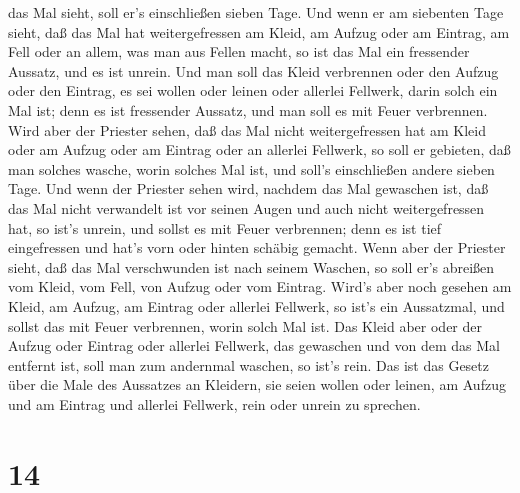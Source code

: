 das Mal sieht, soll er's einschließen sieben Tage.  Und
wenn er am siebenten Tage sieht, daß das Mal hat weitergefressen am
Kleid, am Aufzug oder am Eintrag, am Fell oder an allem, was man aus
Fellen macht, so ist das Mal ein fressender Aussatz, und es ist unrein.
 Und man soll das Kleid verbrennen oder den Aufzug oder den
Eintrag, es sei wollen oder leinen oder allerlei Fellwerk, darin solch
ein Mal ist; denn es ist fressender Aussatz, und man soll es mit Feuer
verbrennen.  Wird aber der Priester sehen, daß das Mal
nicht weitergefressen hat am Kleid oder am Aufzug oder am Eintrag oder
an allerlei Fellwerk,  so soll er gebieten, daß man solches
wasche, worin solches Mal ist, und soll's einschließen andere sieben
Tage.  Und wenn der Priester sehen wird, nachdem das Mal
gewaschen ist, daß das Mal nicht verwandelt ist vor seinen Augen und
auch nicht weitergefressen hat, so ist's unrein, und sollst es mit Feuer
verbrennen; denn es ist tief eingefressen und hat's vorn oder hinten
schäbig gemacht.  Wenn aber der Priester sieht, daß das Mal
verschwunden ist nach seinem Waschen, so soll er's abreißen vom Kleid,
vom Fell, von Aufzug oder vom Eintrag.  Wird's aber noch
gesehen am Kleid, am Aufzug, am Eintrag oder allerlei Fellwerk, so ist's
ein Aussatzmal, und sollst das mit Feuer verbrennen, worin solch Mal
ist.  Das Kleid aber oder der Aufzug oder Eintrag oder
allerlei Fellwerk, das gewaschen und von dem das Mal entfernt ist, soll
man zum andernmal waschen, so ist's rein.  Das ist das
Gesetz über die Male des Aussatzes an Kleidern, sie seien wollen oder
leinen, am Aufzug und am Eintrag und allerlei Fellwerk, rein oder unrein
zu sprechen.

\hypertarget{section-13}{%
\section{14}\label{section-13}}


